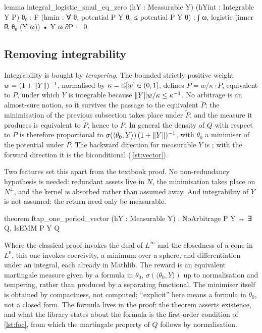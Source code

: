 \documentclass[11pt]{article}
\begin{document}
\begin{leancode}[caption={The first-order condition (\texttt{Foundations/FTAPOnePeriodVector}).},label=lst:foc]
lemma integral_logistic_smul_eq_zero (hY : Measurable Y) (hYint : Integrable Y P)
    {θ₀ : F} (hmin : ∀ θ, potential P Y θ₀ ≤ potential P Y θ) :
    ∫ ω, logistic (inner ℝ θ₀ (Y ω)) • Y ω ∂P = 0
\end{leancode}

\subsection{Removing integrability}
Integrability is bought by \emph{tempering}. The bounded strictly positive weight $w=(1+\lVert Y\rVert)^{-1}$,
normalised by $\kappa=\mathbb{E}[w]\in(0,1]$, defines $\tilde P=w/\kappa\cdot P$, equivalent to $P$, under which
$Y$ is integrable because $\lVert Y\rVert w/\kappa\le\kappa^{-1}$. No arbitrage is an almost-sure notion, so it
survives the passage to the equivalent $\tilde P$; the minimisation of the previous subsection takes place under $\tilde P$, and
the measure it produces is equivalent to $\tilde P$, hence to $P$. In general the density of $Q$ with respect to $P$ is therefore proportional to
$\sigma(\langle\theta_0,Y\rangle)\,(1+\lVert Y\rVert)^{-1}$, with $\theta_0$ a minimiser of the potential under $\tilde P$.
The backward direction for measurable $Y$ is ; with the forward direction it is the
biconditional (\cref{lst:vector}).

Two features set this apart from the textbook proof. No non-redundancy hypothesis is needed: redundant
assets live in $N$, the minimisation takes place on $N^\perp$, and the kernel is absorbed rather than
assumed away. And integrability of $Y$ is not assumed: the return need only be measurable.

\begin{leancode}[caption={The $d$-asset one-period theorem (\texttt{Foundations/FTAPOnePeriodVector}); the context is that of \cref{lst:defs}.},label=lst:vector]
theorem ftap_one_period_vector (hY : Measurable Y) :
    NoArbitrage P Y ↔ ∃ Q, IsEMM P Y Q
\end{leancode}

Where the classical proof invokes the dual of $L^\infty$ and the closedness of a cone in $L^0$, this one
invokes coercivity, a minimum over a sphere, and differentiation under an integral, each already in
Mathlib. The reward is an equivalent martingale measure given by a formula in $\theta_0$,
$\sigma(\langle\theta_0,Y\rangle)$ up to normalisation and tempering, rather than produced by a separating
functional. The minimiser itself is obtained by compactness, not computed; ``explicit'' here means a
formula in $\theta_0$, not a closed form. The formula lives in the proof: the theorem asserts existence,
and what the library states about the formula is the first-order condition of \cref{lst:foc}, from which
the martingale property of $Q$ follows by normalisation.
\end{document}
